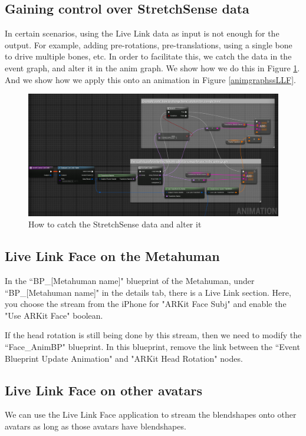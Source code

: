 \documentclass{uva-inf-article}
\begin{document}
\subsection{Gaining control over StretchSense data}
In certain scenarios, using the Live Link data as input is not enough for the output. For example, adding pre-rotations, pre-translations, using a single bone to drive multiple bones, etc. In order to facilitate this, we catch the data in the event graph, and alter it in the anim graph. We show how we do this in Figure \ref{fig:ssPrerot}. And we show how we apply this onto an animation in Figure \ref{animgraphssLLF}. 
\begin{figure}[hbt!]
    \centering
    \includegraphics[width=1\textwidth]{imgs/exampleaddingpre-rotation.png}
    \caption{How to catch the StretchSense data and alter it}
    \label{fig:ssPrerot}
\end{figure}



\subsection{Live Link Face on the Metahuman}
In the ``BP\_[Metahuman name]" blueprint of the Metahuman, under ``BP\_[Metahuman name]" in the details tab, there is a Live Link section. Here, you choose the stream from the iPhone for "ARKit Face Subj" and enable the "Use ARKit Face" boolean.

If the head rotation is still being done by this stream, then we need to modify the ``Face\_AnimBP" blueprint. In this blueprint, remove the link between the ``Event Blueprint Update Animation" and "ARKit Head Rotation" nodes.

\subsection{Live Link Face on other avatars}
We can use the Live Link Face application to stream the blendshapes onto other avatars as long as those avatars have blendshapes. 
\end{document}
